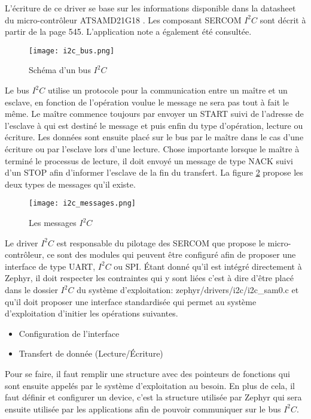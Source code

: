 L'écriture de ce driver se base sur les informations disponible dans la datasheet du micro-contrôleur ATSAMD21G18 \cite{samd21-datasheet}. Les composant SERCOM $I^{2}C$ sont décrit à partir de la page 545. L'application note \cite{samd21-i2c-configuration} a également été consultée.

\begin{figure}[htb]
\centering 
\texttt{[image: i2c\_bus.png]} 
\caption{Schéma d'un bus $I^{2}C$}
\label{fig:i2c_bus}
\end{figure}

Le bus $I^{2}C$ utilise un protocole pour la communication entre un maître et un esclave, en fonction de l'opération voulue le message ne sera pas tout à fait le même. Le maître commence toujours par envoyer un START suivi de l'adresse de l'esclave à qui est destiné le message et puis enfin du type d'opération, lecture ou écriture. Les données sont ensuite placé sur le bus par le maître dans le cas d'une écriture ou par l'esclave lors d'une lecture. Chose importante lorsque le maître à terminé le processus de lecture, il doit envoyé un message de type NACK suivi d'un STOP afin d'informer l'esclave de la fin du transfert.
La figure \ref{fig:i2c_messages} propose les deux types de messages qu'il existe.

\begin{figure}[htb]
\centering 
\texttt{[image: i2c\_messages.png]} 
\caption{Les messages $I^{2}C$}
\label{fig:i2c_messages}
\end{figure}

Le driver $I^{2}C$ est responsable du pilotage des SERCOM que propose le micro-contrôleur, ce sont des modules qui peuvent être configuré afin de proposer une interface de type UART, $I^{2}C$ ou SPI. Étant donné qu'il est intégré directement à Zephyr, il doit respecter les contraintes qui y sont liées c'est à dire d'être placé dans le dossier $I^{2}C$ du système d'exploitation: zephyr/drivers/i2c/i2c\_sam0.c et qu'il doit proposer une interface standardisée qui permet au système d'exploitation d'initier les opérations suivantes.

\begin{itemize}
\item Configuration de l'interface
\item Transfert de donnée (Lecture/Écriture)
\end{itemize}

Pour se faire, il faut remplir une structure avec des pointeurs de fonctions qui sont ensuite appelés par le système d'exploitation au besoin. En plus de cela, il faut définir et configurer un device, c'est la structure utilisée par Zephyr qui sera ensuite utilisée par les applications afin de pouvoir communiquer sur le bus $I^{2}C$.

